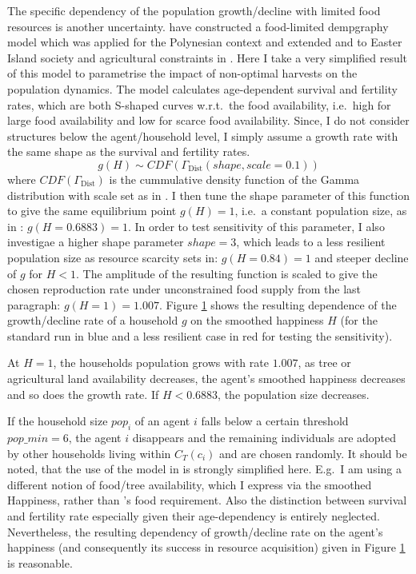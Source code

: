 The specific dependency of the population growth/decline with limited food resources is another uncertainty.
\citet{Lee2008} have constructed a food-limited dempgraphy model which was applied for the Polynesian context \citet{Puleston2008} and extended and to Easter Island society and agricultural constraints in \citet{Puleston2017}. 
Here I take a very simplified result of this model to parametrise the impact of non-optimal harvests on the population dynamics. 
The model calculates age-dependent survival and fertility rates, which are both S-shaped curves w.r.t.\ the food availability, i.e.\ high for large food availability and low for scarce food availability.
Since, I do not consider structures below the agent/household level, I simply assume a growth rate with the same shape as the survival and fertility rates.
\begin{equation}
g(H) \sim CDF(\Gamma_\text{Dist}(shape, scale=0.1))
\end{equation}
where $CDF(\Gamma_\text{Dist})$ is the cummulative density function of the Gamma distribution with scale set as in \citet{Lee2008}.
I then tune the shape parameter of this function to give the same equilibrium point $g(H)=1$, i.e.\ a constant population size, as in \citet{Puleston2017}: $g(H=0.6883)=1$. 
In order to test sensitivity of this parameter, I also investigae a higher shape parameter $shape=3$\TODO, which leads to a less resilient population size as resource scarcity sets in: $g(H=0.84)=1$ and steeper decline of $g$ for $H<1$.
The amplitude of the resulting function is scaled to give the chosen reproduction rate under unconstrained food supply from the last paragraph: $g(H=1)=1.007$.
Figure \ref{fig:growthrate} shows the resulting dependence of the growth/decline rate of a household $g$ on the smoothed happiness $H$ (for the standard run in blue and a less resilient case in red for testing the sensitivity).
\begin{figure}
	\centering
	\caption{}
	\label{fig:growthrate}
\end{figure}
At $H=1$, the households population grows with rate $1.007$, as tree or agricultural land availability decreases, the agent's smoothed happiness decreases and so does the growth rate. If $H<0.6883$, the population size decreases.

If the household size $pop_i$ of an agent $i$ falls below a certain threshold $pop\_min = 6$, the agent $i$ disappears and the remaining individuals are adopted by other households living within $C_T(c_i)$ and are chosen randomly. \TODO
It should be noted, that the use of the model in \citet{Pulestion2017} is strongly simplified here.
E.g.\ I am using a different notion of food/tree availability, which I express via the smoothed Happiness, rather than \citet{Puleston2017}'s food requirement.
Also the distinction between survival and fertility rate especially given their age-dependency is entirely neglected.
Nevertheless, the resulting dependency of growth/decline rate on the agent's happiness (and consequently its success in resource acquisition) given in Figure \ref{fig:growthrate} is reasonable. 


